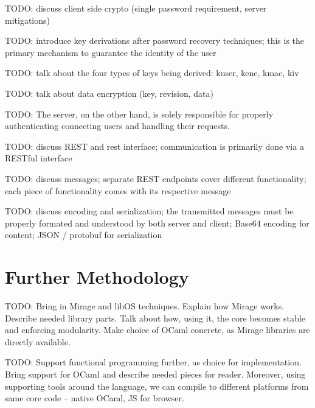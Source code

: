TODO: discuss client side crypto (single password requirement, server mitigations)

TODO: introduce key derivations after password recovery techniques; this is the primary mechanism to guarantee the identity of the user

TODO: talk about the four types of keys being derived: kuser, kenc, kmac, kiv

TODO: talk about data encryption (key, revision, data)

TODO: The server, on the other hand, is solely responsible for properly authenticating connecting users and handling their requests.

TODO: discuss REST and rest interface; communication is primarily done via a RESTful interface

TODO: discuss messages; separate REST endpoints cover different functionality; each piece of functionality comes with its respective message

TODO: discuss encoding and serialization; the transmitted messages must be properly formated and understood by both server and client; Base64 encoding for content; JSON / protobuf for serialization

\section{Further Methodology}
TODO: Bring in Mirage and libOS techniques. Explain how Mirage works. Describe needed library parts. Talk about how, using it, the core becomes stable and enforcing modularity. Make choice of OCaml concrete, as Mirage libraries are directly available.

TODO: Support functional programming further, as choice for implementation. Bring support for OCaml and describe needed pieces for reader. Moreover, using supporting tools around the language, we can compile to different platforms from same core code -- native OCaml, JS for browser.
